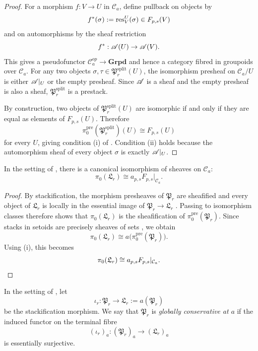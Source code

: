 \begin{proof}
For a morphism $f:V\to U$ in $\mathcal C_a$, define pullback on objects by
\[
f^*(\sigma):=\mathrm{res}_V^U(\sigma)\in F_{p,s}(V)
\]
and on automorphisms by the sheaf restriction
\[
f^*:\mathscr{A}(U)\to \mathscr{A}(V).
\]
This gives a pseudofunctor $\mathcal C_a^{op}\to \mathbf{Grpd}$ and hence a category fibred in groupoids over $\mathcal C_a$. For any two objects $\sigma,\tau\in \mathfrak P_r^{\mathrm{split}}(U)$, the isomorphism presheaf on $\mathcal C_a/U$ is either $\mathscr{A}|_U$ or the empty presheaf. Since $\mathscr{A}$ is a sheaf and the empty presheaf is also a sheaf, $\mathfrak P_r^{\mathrm{split}}$ is a prestack.

By construction, two objects of $\mathfrak P_r^{\mathrm{split}}(U)$ are isomorphic if and only if they are equal as elements of $F_{p,s}(U)$. Therefore
\[
\pi_0^{\mathrm{pre}}(\mathfrak P_r^{\mathrm{split}})(U)\cong F_{p,s}(U)
\]
for every $U$, giving condition \textup{(i)} of . Condition \textup{(ii)} holds because the automorphism sheaf of every object $\sigma$ is exactly $\mathscr{A}|_U$.
\end{proof}

\begin{proposition}\label{prop:stackification-components}
In the setting of , there is a canonical isomorphism of sheaves on $\mathcal C_a$:
\[
\pi_0(\mathfrak L_r)\cong a_{p,s}F_{p,s}|_{\mathcal C_a}.
\]
\end{proposition}

\begin{proof}
By stackification, the morphism presheaves of $\mathfrak P_r$ are sheafified and every object of $\mathfrak L_r$ is locally in the essential image of $\mathfrak P_r\to \mathfrak L_r$ \cite[Tag 02ZP]{StacksProject}. Passing to isomorphism classes therefore shows that $\pi_0(\mathfrak L_r)$ is the sheafification of $\pi_0^{\mathrm{pre}}(\mathfrak P_r)$. Since stacks in setoids are precisely sheaves of sets \cite[Tag 042Y]{StacksProject}, we obtain
\[
\pi_0(\mathfrak L_r)\cong a\bigl(\pi_0^{\mathrm{pre}}(\mathfrak P_r)\bigr).
\]
Using (i), this becomes
\[
\pi_0(\mathfrak L_r)\cong a_{p,s}F_{p,s}|_{\mathcal C_a}.
\qedhere
\]
\end{proof}

\begin{definition}\label{def:global-conservativity}
In the setting of , let
\[
\iota_r:\mathfrak P_r\to \mathfrak L_r:=a(\mathfrak P_r)
\]
be the stackification morphism. We say that $\mathfrak P_r$ is \emph{globally conservative at $a$} if the induced functor on the terminal fibre
\[
(\iota_r)_a:(\mathfrak P_r)_a\to (\mathfrak L_r)_a
\]
is essentially surjective.
\end{definition}

